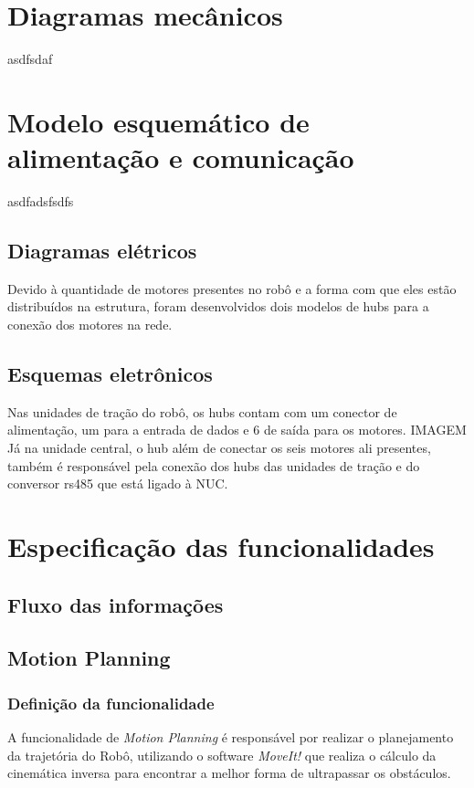 \section{Diagramas mecânicos}
\label{sec:diagm}
asdfsdaf

\section{Modelo esquemático de alimentação e comunicação}
\label{sec:modesq}
asdfadsfsdfs

\subsection{Diagramas elétricos}
\label{sec:diage}
Devido à quantidade de motores presentes no robô e a forma com que eles estão distribuídos na estrutura, foram desenvolvidos dois modelos de hubs para a conexão dos motores na rede.

\subsection{Esquemas eletrônicos}
\label{ssec:esqe}
Nas unidades de tração do robô, os hubs contam com um conector de alimentação, um para a entrada de dados e 6 de saída para os motores.
IMAGEM
Já na unidade central, o hub além de conectar os seis motores ali presentes, também é responsável pela conexão dos hubs das unidades de tração e do conversor rs485 que está ligado à NUC.

\section{Especificação das funcionalidades}
\label{sec:espf}


\subsection{Fluxo das informações}
\label{ssec:fluxo}


\subsection{Motion Planning}
\label{ssec:motion}
\subsubsection{Definição da funcionalidade}
A funcionalidade de \textit{Motion Planning} é responsável por realizar o planejamento da trajetória do Robô, utilizando o software \textit{MoveIt!} que realiza o cálculo da cinemática inversa para encontrar a melhor forma de ultrapassar os obstáculos.
